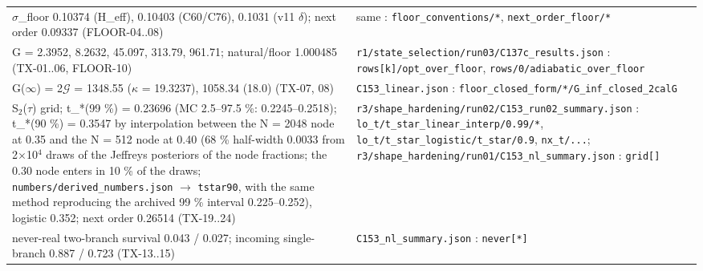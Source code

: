 {\begin{longtable}{@{}>{\raggedright\arraybackslash}p{}>{\raggedright\arraybackslash}p{}@{}}
\ensuremath{\sigma}\_\allowbreak{}floor 0.10374 (H\_\allowbreak{}eff), 0.10403 (C60/\allowbreak{}C76), 0.1031 (v11 \ensuremath{\delta}); next order 0.09337 (FLOOR-04..08) & same : \texttt{floor\_\allowbreak{}conventions/\allowbreak{}*}, \texttt{next\_\allowbreak{}order\_\allowbreak{}floor/\allowbreak{}*} \\
G = 2.3952, 8.2632, 45.097, 313.79, 961.71; natural/\allowbreak{}floor 1.000485 (TX-01..06, FLOOR-10) & \texttt{r1/\allowbreak{}state\_\allowbreak{}selection/\allowbreak{}run03/\allowbreak{}C137c\_\allowbreak{}results.json} : \texttt{rows[k]/\allowbreak{}opt\_\allowbreak{}over\_\allowbreak{}floor}, \texttt{rows/\allowbreak{}0/\allowbreak{}adiabatic\_\allowbreak{}over\_\allowbreak{}floor} \\
G(\ensuremath{\infty}) = 2\ensuremath{\mathcal{G}} = 1348.55 (\ensuremath{\kappa} = 19.3237), 1058.34 (18.0) (TX-07, 08) & \texttt{C153\_\allowbreak{}linear.json} : \texttt{floor\_\allowbreak{}closed\_\allowbreak{}form/\allowbreak{}*/\allowbreak{}G\_\allowbreak{}inf\_\allowbreak{}closed\_\allowbreak{}2calG} \\
S\ensuremath{_2}(\ensuremath{\tau}) grid; t\_\allowbreak{}*(99 \%) = 0.23696 (MC 2.5--97.5 \%: 0.2245--0.2518); t\_\allowbreak{}*(90 \%) = 0.3547 by interpolation between the N = 2048 node at 0.35 and the N = 512 node at 0.40 (68 \% half-width 0.0033 from 2\ensuremath{\times}10\ensuremath{^4} draws of the Jeffreys posteriors of the node fractions; the 0.30 node enters in 10 \% of the draws; \texttt{numbers/\allowbreak{}derived\_\allowbreak{}numbers.json} \ensuremath{\to} \texttt{tstar90}, with the same method reproducing the archived 99 \% interval 0.225--0.252), logistic 0.352; next order 0.26514 (TX-19..24) & \texttt{r3/\allowbreak{}shape\_\allowbreak{}hardening/\allowbreak{}run02/\allowbreak{}C153\_\allowbreak{}run02\_\allowbreak{}summary.json} : \texttt{lo\_\allowbreak{}t/\allowbreak{}t\_\allowbreak{}star\_\allowbreak{}linear\_\allowbreak{}interp/\allowbreak{}0.99/\allowbreak{}*}, \texttt{lo\_\allowbreak{}t/\allowbreak{}t\_\allowbreak{}star\_\allowbreak{}logistic/\allowbreak{}t\_\allowbreak{}star/\allowbreak{}0.9}, \texttt{nx\_\allowbreak{}t/\allowbreak{}...}; \texttt{r3/\allowbreak{}shape\_\allowbreak{}hardening/\allowbreak{}run01/\allowbreak{}C153\_\allowbreak{}nl\_\allowbreak{}summary.json} : \texttt{grid[]} \\
never-real two-branch survival 0.043 /\allowbreak{} 0.027; incoming single-branch 0.887 /\allowbreak{} 0.723 (TX-13..15) & \texttt{C153\_\allowbreak{}nl\_\allowbreak{}summary.json} : \texttt{never[*]} \\

\end{longtable}}
